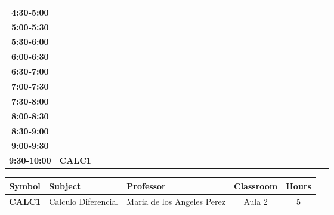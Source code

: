 \documentclass{article}
\begin{document}
\begin{table}[ht]
\begin{tabular}{|c|c|c|c|c|c|c|c|c|c|c|c|c|c|c|c|c|c|c|c|c|c|c|c|c|c|c|c|c|c|}
\textbf{4:30-5:00} &   &   &   &   &   &   &   \\
\cline{1-8} 
\textbf{5:00-5:30} &   &   &   &   &   &   &   \\
\cline{1-8} 
\textbf{5:30-6:00} &   &   &   &   &   &   &   \\
\cline{1-8} 
\textbf{6:00-6:30} &   &   &   &   &   &   &   \\
\cline{1-8} 
\textbf{6:30-7:00} &   &   &   &   &   &   &   \\
\cline{1-8} 
\textbf{7:00-7:30} &   &   &   &   &   &   &   \\
\cline{1-8} 
\textbf{7:30-8:00} &   &   &   &   &   &   &   \\
\cline{1-8} 
\textbf{8:00-8:30} &   &   &   &   &   &   &   \\
\cline{1-8} 
\textbf{8:30-9:00} & \cellcolor[RGB]{208,65,73} &   &   &   &   &   &   \\
\cline{1-1} \cline{3-8} 
\textbf{9:00-9:30} & \cellcolor[RGB]{208,65,73} &   &   &   &   &   &   \\
\cline{1-1} \cline{3-8} 
\textbf{9:30-10:00} & \multirow{-3}{*}{\cellcolor[RGB]{208,65,73} \textbf{CALC1} } &   &   &   &   &   &   \\
\cline{1-8} 
\end{tabular}\end{table}

            
\begin{longtable}{|c|p{4cm}|p{4cm}|c|c|}
\hline
\textbf{Symbol} & \textbf{Subject} & \textbf{Professor} & \textbf{Classroom} & \textbf{Hours} \\
\hline

\hline
\cellcolor[rgb]{0.8156862745098039,0.2549019607843137,0.28627450980392155} \textbf{CALC1} & Calculo Diferencial & Maria de los Angeles Perez & Aula 2 & 5  \\
\hline
\end{longtable}
            
            \newpage
            
\end{document}
